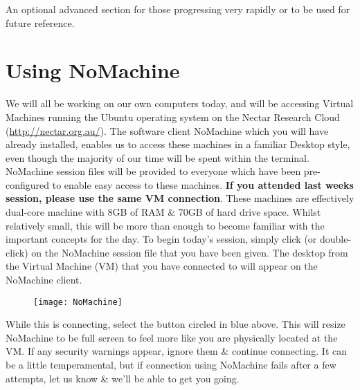 \begin{advanced}
An optional advanced section for those progressing very rapidly or to be used for future reference. \\
\end{advanced}

\section{Using NoMachine} \label{sec:NoMachine}
\begin{information}
We will all be working on our own computers today, and will be accessing Virtual Machines running the Ubuntu operating system on the Nectar Research Cloud (\url{http://nectar.org.au/}).
The software client NoMachine which you will have already installed, enables us to access these machines in a familiar Desktop style, even though the majority of our time will be spent within the terminal. \\

NoMachine session files will be provided to everyone which have been pre-configured to enable easy access to these machines.
\textbf{If you attended last weeks session, please use the same VM connection}.
These machines are effectively dual-core machine with 8GB of RAM \& 70GB of hard drive space.
Whilst relatively small, this will be more than enough to become familiar with the important concepts for the day.
To begin today's session, simply click (or double-click) on the NoMachine session file that you have been given.
The desktop from the Virtual Machine (VM) that you have connected to will appear on the NoMachine client. \\
\end{information}

\begin{figure}[h!]
  \centering
    \texttt{[image: NoMachine]}
\end{figure}

\begin{information}
While this is connecting, select the button circled in blue above.
This will resize NoMachine to be full screen to feel more like you are physically located at the VM.
If any security warnings appear, ignore them \& continue connecting. 
It can be a little temperamental, but if connection using NoMachine fails after a few attempts, let us know \& we'll be able to get you going.\\
\end{information}

